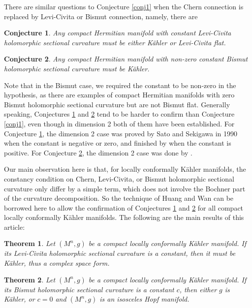 \documentclass{amsart}
\newtheorem{theorem}{Theorem}%
\newtheorem{conjecture}{Conjecture}
\numberwithin{equation}{section}
\begin{document}
There are similar  questions to Conjecture \ref{conj1} when the Chern connection is replaced by Levi-Civita or Bismut connection, namely, there are

\begin{conjecture} \label{conj2}
Any compact Hermitian manifold with constant Levi-Civita holomorphic sectional curvature must be either K\"ahler or Levi-Civita flat.
\end{conjecture}


\begin{conjecture} \label{conj3}
Any compact Hermitian manifold with non-zero constant Bismut holomorphic sectional curvature must be K\"ahler.
\end{conjecture}

Note that in the Bismut case, we required the constant to be non-zero in the hypothesis, as there are examples of compact Hermitian manifolds with zero Bismut holomorphic sectional curvature but are not Bismut flat. Generally speaking, Conjectures \ref{conj2} and \ref{conj3} tend to be harder to confirm than Conjecture \ref{conj1}, even though in dimension 2 both of them have been established. For Conjecture \ref{conj2}, the dimension 2 case was proved by Sato and Sekigawa \cite{SS} in 1990 when the constant is negative or zero, and finished by \cite{ADM} when the constant is positive. For Conjecture \ref{conj3}, the dimension 2 case was done by \cite{ChenZ}.

Our main observation here is that, for locally conformally K\"ahler manifolds, the constancy condition on Chern, Levi-Civita, or Bismut holomorphic sectional curvature only differ by a simple term, which does not involve the Bochner part of the curvature decomposition. So the technique of Huang and Wan can be borrowed here to allow the confirmation of Conjectures \ref{conj2} and \ref{conj3} for all compact locally conformally K\"ahler manifolds. The following are the main results of this article:

\begin{theorem}  \label{thm1}
Let $(M^n,g)$ be a compact locally conformally K\"ahler manifold. If its Levi-Civita holomorphic sectional curvature is a constant, then it must be K\"ahler, thus a complex space form.
\end{theorem}

\begin{theorem}  \label{thm2}
Let $(M^n,g)$ be a compact locally conformally K\"ahler manifold. If its Bismut holomorphic sectional curvature is a constant $c$, then either $g$ is K\"ahler, or $c=0$ and $(M^n,g)$ is an isosceles Hopf manifold.
\end{theorem}
\end{document}
